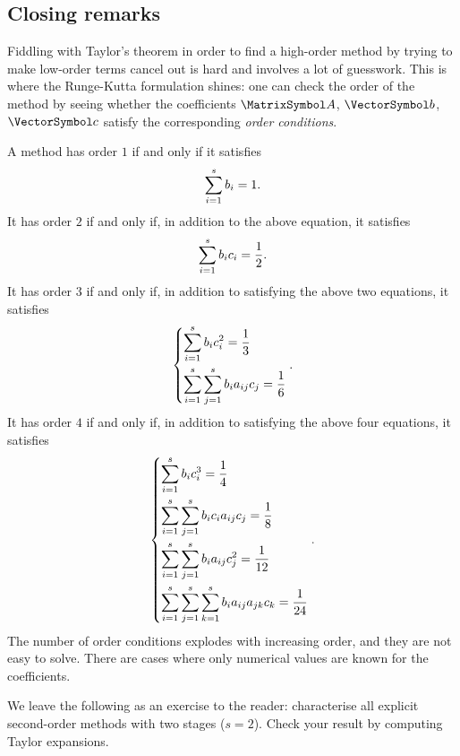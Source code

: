 \documentclass[10pt, a4paper, twoside]{basestyle}
\begin{document}
\subsection*{Closing remarks}
Fiddling with Taylor's theorem in order to find a high-order method by trying to make low-order terms cancel out is hard and involves a lot of guesswork. This is where the Runge-Kutta formulation shines: one can check the order of the method by seeing whether the coefficients $\matA$, $\vb$, $\vc$ satisfy the corresponding \emph{order conditions}.

A method has order $1$ if and only if it satisfies\[
\sum{i=1}[s]b_i =1\text.\]
It has order $2$ if and only if, in addition to the above equation, it satisfies\[
\sum{i=1}[s]b_ic_i =\frac 1 2 \text.\]
It has order $3$ if and only if, in addition to satisfying the above two equations, it satisfies\[
\begin{dcases}
\sum{i=1}[s]b_ic_i^2 =\frac 1 3 \\
\sum{i=1}[s]\sum{j=1}[s]b_ia_{ij}c_j =\frac 1 6 
\end{dcases}\text.
\]
It has order $4$ if and only if, in addition to satisfying the above four equations, it satisfies\[
\begin{dcases}
\sum{i=1}[s]b_ic_i^3 =\frac 1 4 \\
\sum{i=1}[s]\sum{j=1}[s]b_ic_ia_{ij}c_j =\frac 1 8 \\
\sum{i=1}[s]\sum{j=1}[s]b_ia_{ij}c_j^2 =\frac {1} {12} \\
\sum{i=1}[s]\sum{j=1}[s]\sum{k=1}[s]b_ia_{ij}a_{jk}c_k =\frac {1} {24} \\
\end{dcases}\text.
\]
The number of order conditions explodes with increasing order, and they are not easy to solve. There are cases where only numerical values are known for the coefficients.

We leave the following as an exercise to the reader: characterise all explicit second-order methods with two stages ($s=2$). Check your result by computing Taylor expansions.
\end{document}
